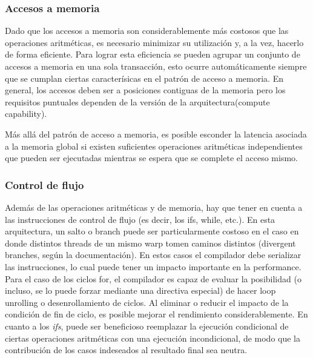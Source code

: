 \documentclass[a4paper,10pt]{report}
\begin{document}
\subsubsection{Accesos a memoria}
Dado que los accesos a memoria son considerablemente más costosos que las operaciones aritméticas, es necesario minimizar su utilización y, a la vez, hacerlo de forma eficiente. 
Para lograr esta eficiencia se pueden agrupar un conjunto de accesos a memoria en una sola transacción, esto ocurre automáticamente siempre que se cumplan ciertas caracterísicas en el patrón de acceso a memoria.
En general, los accesos deben ser a posiciones contiguas de la memoria pero los requisitos puntuales dependen de la versión de la arquitectura(compute capability). 



% 

Más allá del patrón de acceso a memoria, es posible esconder la latencia asociada a la memoria global si existen suficientes operaciones aritméticas independientes que pueden ser ejecutadas mientras
se espera que se complete el acceso mismo.


\subsubsection{Control de flujo}

Además de las operaciones aritméticas y de memoria, hay que tener en cuenta a las instrucciones
de control de flujo (es decir, los ifs, while, etc.). En esta arquitectura, un salto o branch puede ser particularmente costoso en el caso en donde distintos threads de un mismo warp tomen caminos distintos
(divergent branches, según la documentación). En estos casos el compilador debe serializar las instrucciones, lo cual puede tener un impacto importante en la performance.
Para el caso de los ciclos for, el compilador es capaz de evaluar la posibilidad (o incluso, se lo puede forzar mediante una directiva especial) de hacer loop unrolling o desenrollamiento de ciclos. Al eliminar o
reducir el impacto de la condición de fin de ciclo, es posible mejorar el rendimiento considerablemente.
En cuanto a los \textit{ifs}, puede ser beneficioso reemplazar la ejecución condicional de ciertas operaciones
aritméticas con una ejecución incondicional, de modo que la contribución de los casos indeseados al
resultado final sea neutra.
\end{document}

